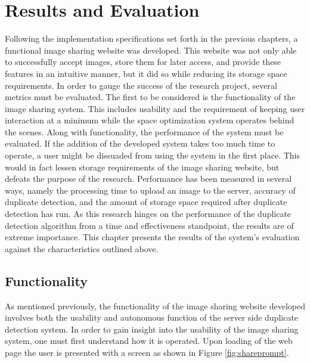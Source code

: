 %
%
%
\chapter{Results and Evaluation}\label{ch:reseval}
Following the implementation specifications set forth in the previous chapters, a functional image sharing website was developed. This website was not only able to successfully accept images, store them for later access, and provide these features in an intuitive manner, but it did so while reducing its storage space requirements. In order to gauge the success of the research project, several metrics must be evaluated. The first to be considered is the functionality of the image sharing system. This includes usability and the requirement of keeping user interaction at a minimum while the space optimization system operates behind the scenes. Along with functionality, the performance of the system must be evaluated. If the addition of the developed system takes too much time to operate, a user might be dissuaded from using the system in the first place. This would in fact lessen storage requirements of the image sharing website, but defeats the purpose of the research. Performance has been measured in several ways, namely the processing time to upload an image to the server, accuracy of duplicate detection, and the amount of storage space required after duplicate detection has run. As this research hinges on the performance of the duplicate detection algorithm from a time and effectiveness standpoint, the results are of extreme importance. This chapter presents the results of the system's evaluation against the characteristics outlined above.

\section{Functionality}
As mentioned previously, the functionality of the image sharing website developed involves both the usability and autonomous function of the server side duplicate detection system. In order to gain insight into the usability of the image sharing system, one must first understand how it is operated. Upon loading of the web page the user is presented with a screen as shown in Figure \ref{fig:shareprompt}.

